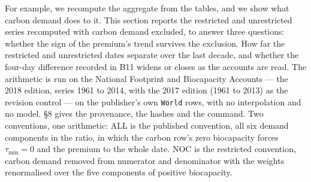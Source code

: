 \documentclass[11pt]{article}
\begin{document}
For example, we recompute the aggregate from the tables, and we show what carbon demand does to it. This section reports the restricted and unrestricted series recomputed with carbon demand excluded, to answer three questions: whether the sign of the premium's trend survives the exclusion. How far the restricted and unrestricted dates separate over the last decade, and whether the four-day difference recorded in B11 widens or closes as the accounts are read. The arithmetic is run on the National Footprint and Biocapacity Accounts --- the 2018 edition, series 1961 to 2014, with the 2017 edition (1961 to 2013) as the revision control --- on the publisher's own \texttt{World} rows, with no interpolation and no model. \S8 gives the provenance, the hashes and the command. Two conventions, one arithmetic: ALL is the published convention, all six demand components in the ratio, in which the carbon row's zero biocapacity forces \(\tau_{\min} = 0\) and the premium to the whole date. NOC is the restricted convention, carbon demand removed from numerator and denominator with the weights renormalised over the five components of positive biocapacity.
\end{document}
